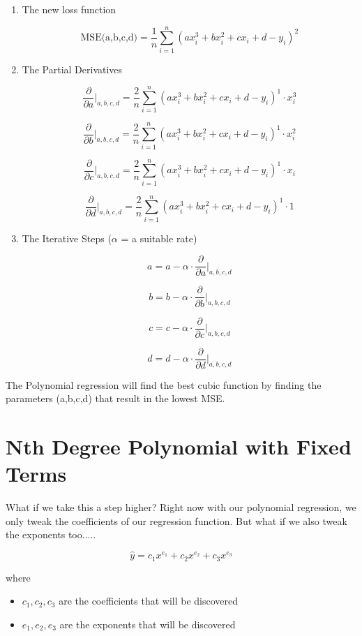 \documentclass[11pt]{article}
\begin{document}
\begin{enumerate}
    \item The new loss function

\[
\text{MSE(a,b,c,d)} = \frac{1}{n} \sum_{i=1}^{n} (ax_i^3 + bx_i^2 + cx_i + d - y_i)^2
\]

    \item The Partial Derivatives

\[
\frac{\partial}{\partial a} \Big|_{a,b,c,d} = \frac{2}{n} \sum_{i=1}^{n} (ax_i^3 + bx_i^2 + cx_i + d - y_i)^1 \cdot x_i^3
\]

\[
\frac{\partial}{\partial b} \Big|_{a,b,c,d} = \frac{2}{n} \sum_{i=1}^{n} (ax_i^3 + bx_i^2 + cx_i + d - y_i)^1 \cdot x_i^2
\]

\[
\frac{\partial}{\partial c} \Big|_{a,b,c,d} = \frac{2}{n} \sum_{i=1}^{n} (ax_i^3 + bx_i^2 + cx_i + d - y_i)^1 \cdot x_i
\]

\[
\frac{\partial}{\partial d} \Big|_{a,b,c,d} = \frac{2}{n} \sum_{i=1}^{n} (ax_i^3 + bx_i^2 + cx_i + d - y_i)^1 \cdot 1
\]

    \item The Iterative Steps (\(\alpha\) = a suitable rate)

\[a = a - \alpha \cdot \frac{\partial}{\partial a} \Big|_{a,b,c,d}\]

\[b = b - \alpha \cdot \frac{\partial}{\partial b} \Big|_{a,b,c,d}\]

\[c = c - \alpha \cdot \frac{\partial}{\partial c} \Big|_{a,b,c,d}\]

\[d = d - \alpha \cdot \frac{\partial}{\partial d} \Big|_{a,b,c,d}\]
    
\end{enumerate}

The Polynomial regression will find the best cubic function by finding the parameters (a,b,c,d) that result in the lowest MSE.

\newpage

\section{Nth Degree Polynomial with Fixed Terms}
What if we take this a step higher? Right now with our polynomial regression, we only tweak the coefficients of our regression function. But what if we also tweak the exponents too.....


\[
\hat{y} = c_1x^{e_1} + c_2x^{e_2} + c_3x^{e_3}
\]

where
\begin{itemize}
    \item \(c_1,c_2,c_3\) are the coefficients that will be discovered
    \item \(e_1,e_2,e_3\) are the exponents that will be discovered
\end{itemize}
\end{document}
